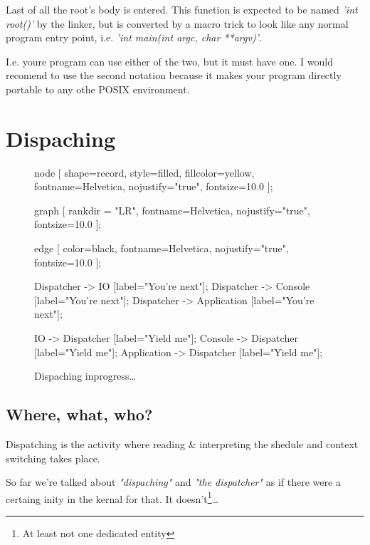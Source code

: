 		Last of all the root's body is entered. This function is expected to be named \textit{'int root()'} by the linker, but is converted by a macro trick to look like any normal program entry point, i.e. \textit{'int main(int argc, char **argv)'}. 

		I.e. youre program can use either of the two, but it must have one. I would recomend to use the second notation because it makes your program directly portable to any othe POSIX environment.




\chapter{Dispaching}

\begin{figure}[!hbp]
\begin{dotpic}
	node [
		shape=record,
		style=filled,
		fillcolor=yellow,
		fontname=Helvetica,
		nojustify="true",
		fontsize=10.0
	];

	graph [
		rankdir = "LR",
		fontname=Helvetica,
		nojustify="true",
		fontsize=10.0
	];

	edge [
		color=black,
		fontname=Helvetica,
		nojustify="true",
		fontsize=10.0
	];

	Dispatcher -> IO		[label="You're next"];
	Dispatcher -> Console		[label="You're next"];
	Dispatcher -> Application 	[label="You're next"];

	IO -> Dispatcher		[label="Yield me"];
	Console -> Dispatcher		[label="Yield me"];
	Application -> Dispatcher	[label="Yield me"];
\end{dotpic}
\caption{Dispaching inprogress\ldots\label{disp1}}	
\end{figure}

\section{Where, what, who?}
Dispatching is the activity where reading \& interpreting the shedule and context switching takes place.

So far we're talked about \textit{"dispaching"} and \textit{"the dispatcher"} as if there were a certaing inity in the kernal for that. It doesn't\footnote{At least not one dedicated entity}\ldots

